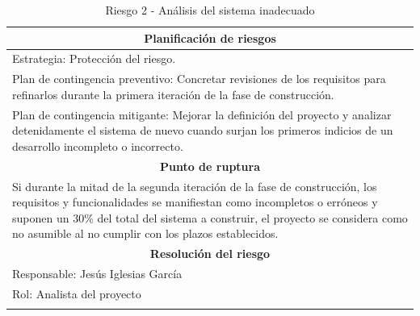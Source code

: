 \documentclass[12pt,a4paper, twoside]{report}
\begin{document}
\begin{longtable}{m{4cm}|m{5cm}|m{4cm}}
		\multicolumn{3}{|c|}{\textbf{Planificación de riesgos}} \\ \hline \hline
		\multicolumn{3}{|p{17cm}|}{Estrategia: Protección del riesgo.} \\ \hline
		\multicolumn{3}{|p{17cm}|}{Plan de contingencia preventivo: Concretar revisiones de los requisitos para refinarlos durante la primera iteración de la fase de construcción.} \\ \hline
		\multicolumn{3}{|p{17cm}|}{Plan de contingencia mitigante: Mejorar la definición del proyecto y analizar detenidamente el sistema de nuevo cuando surjan los primeros indicios de un desarrollo incompleto o incorrecto.} \\ \hline
			
		\multicolumn{3}{|c|}{\textbf{Punto de ruptura}} \\ \hline \hline
		\multicolumn{3}{|p{17cm}|}{Si durante la mitad de la segunda iteración de la fase de construcción, los requisitos y funcionalidades se manifiestan como incompletos o erróneos y suponen un 30\% del total del sistema a construir, el proyecto se considera como no asumible al no cumplir con los plazos establecidos.}\\ \hline
			
		\multicolumn{3}{|c|}{\textbf{Resolución del riesgo}} \\ \hline \hline
		\multicolumn{3}{|p{17cm}|}{Responsable: Jesús Iglesias García}\\ \hline
		\multicolumn{3}{|p{17cm}|}{Rol: Analista del proyecto} \\ \hline
		\caption{Riesgo 2 - Análisis del sistema inadecuado}
	\end{longtable}
	
	\hspace{1cm}
	
\end{document}
